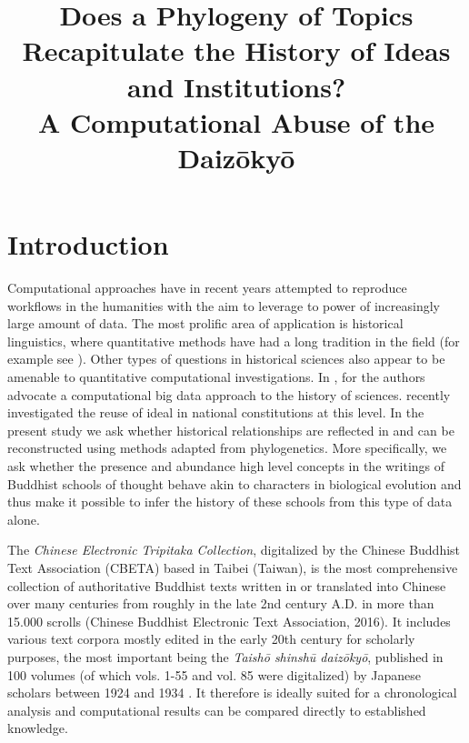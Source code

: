 \documentclass[a4paper,10pt]{article}
\title{Does a Phylogeny of Topics Recapitulate the History of Ideas and 
  Institutions? \\
  A Computational Abuse of the Daiz{\=o}ky{\=o}}
\date{}
\begin{document}
\maketitleabstract

\section{Introduction}

Computational approaches have in recent years attempted to reproduce
workflows in the humanities with the aim to leverage to power of
increasingly large amount of data. The most prolific area of application is
historical linguistics, where quantitative methods have had a long
tradition in the field (for example see 
\cite{levinson_tools_2012,gray_language-tree_2003,croft2008evolutionary}). 
Other types of questions in historical sciences also appear to be
amenable to quantitative computational investigations. In
\cite{Laubichler:13}, for the authors advocate a computational big data
approach to the history of sciences. \cite{Rockmore:16} recently
investigated the reuse of ideal in national constitutions at this level. In
the present study we ask whether historical relationships are reflected in
and can be reconstructed using methods adapted from phylogenetics. More
specifically, we ask whether the presence and abundance high level concepts
in the writings of Buddhist schools of thought behave akin to characters in
biological evolution and thus make it possible to infer the history of
these schools from this type of data alone.

The \textit{Chinese Electronic Tripitaka Collection}, digitalized by the Chinese 
Buddhist Text Association (CBETA) based in Taibei (Taiwan), is the most 
comprehensive collection of authoritative Buddhist texts written in or 
translated into Chinese over many centuries from roughly in the late 2nd 
century A.D. in more than 15.000 scrolls (Chinese Buddhist Electronic 
Text Association, 2016). It includes various text corpora mostly edited 
in the early 20th century for scholarly purposes, the most important 
being the \emph{Taish{\=o} shinsh{\=u} daiz{\=o}ky{\=o}}, published in 100 volumes (of which 
vols. 1-55 and vol. 85 were digitalized) by Japanese scholars between 
1924 and 1934 \cite{Juniro:24-34}. It therefore is ideally suited for
a chronological analysis and computational results can be compared directly
to established knowledge.
\end{document}
